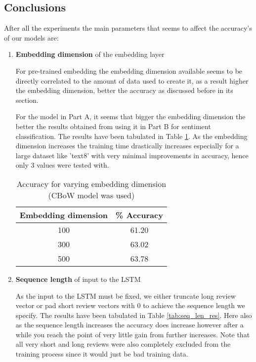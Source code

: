 \documentclass{article}
\begin{document}
\subsection*{Conclusions}
After all the experiments the main parameters that seems to affect the accuracy's of our models are:
\begin{enumerate}
    \item \textbf{Embedding dimension} of the embedding layer
    
    For pre-trained embedding the embedding dimension available seems to be directly correlated to the amount of data used to create it, as a result higher the embedding dimension, better the accuracy as discussed before in its section. 
    
    For the model in Part A, it seems that bigger the embedding dimension the better the results obtained from using it in Part B for sentiment classification. The results have been tabulated in Table \ref{tab:emb_dim_res}. As the embedding dimension increases the training time drastically increases especially for a large dataset like 'text8' with very minimal improvements in accuracy, hence only 3 values were tested with.
    \begin{table}[h!]
    \begin{center}
    \begin{tabular}{ |c|c|} 
     \hline
    Embedding dimension  & \% Accuracy \\ 
     \hline \hline
    100 &   61.20\\
     \hline
    300 &   63.02\\ 
    \hline
    500  & 63.78\\
    \hline
    \hline
    \end{tabular}
    \caption{Accuracy for varying embedding dimension (CBoW model was used) }
    \label{tab:emb_dim_res}
    \end{center}
    \end{table}
    
    \item \textbf{Sequence length} of input to the LSTM 
    
    As the input to the LSTM must be fixed, we either truncate long review vector or pad short review vectors with 0 to achieve the sequence length we specify. The results have been tabulated in Table \ref{tab:seq_len_res}. Here also as the sequence length increases the accuracy does increase however after a while you reach the point of very little gain from further increases. Note that all very short and long reviews were also completely excluded from the training process since it would just be bad training data.
    

\end{enumerate}
\end{document}
